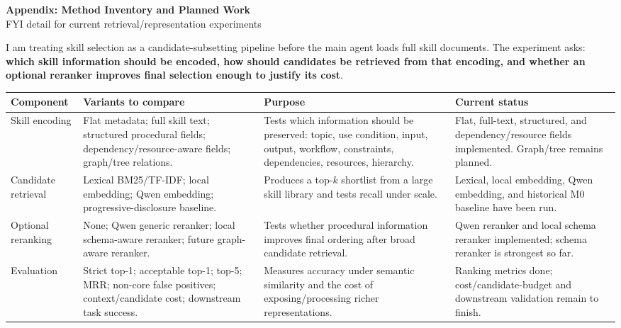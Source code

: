 \documentclass[10pt,a4paper]{article}
\newcommand{\sectiontitle}[1]{\vspace{0.22em}{\normalsize\bfseries\color{headingblue} #1}\par\vspace{-0.35em}}
\begin{document}
\newpage

\begin{center}
{\large\bfseries Appendix: Method Inventory and Planned Work}\\[-0.15em]
{\small FYI detail for current retrieval/representation experiments}
\end{center}

\sectiontitle{Planned Retrieval Architecture}

I am treating skill selection as a candidate-subsetting pipeline before the main agent loads full skill documents. The experiment asks: \textbf{which skill information should be encoded, how should candidates be retrieved from that encoding, and whether an optional reranker improves final selection enough to justify its cost}.

\begin{center}
\scriptsize
\begin{tabular}{@{}p{3.1cm}p{5.0cm}p{4.1cm}p{4.7cm}@{}}
\toprule
\textbf{Component} & \textbf{Variants to compare} & \textbf{Purpose} & \textbf{Current status} \\
\midrule
Skill encoding & Flat metadata; full skill text; structured procedural fields; dependency/resource-aware fields; graph/tree relations. & Tests which information should be preserved: topic, use condition, input, output, workflow, constraints, dependencies, resources, hierarchy. & Flat, full-text, structured, and dependency/resource fields implemented. Graph/tree remains planned. \\
Candidate retrieval & Lexical BM25/TF-IDF; local embedding; Qwen embedding; progressive-disclosure baseline. & Produces a top-$k$ shortlist from a large skill library and tests recall under scale. & Lexical, local embedding, Qwen embedding, and historical M0 baseline have been run. \\
Optional reranking & None; Qwen generic reranker; local schema-aware reranker; future graph-aware reranker. & Tests whether procedural information improves final ordering after broad candidate retrieval. & Qwen reranker and local schema reranker implemented; schema reranker is strongest so far. \\
Evaluation & Strict top-1; acceptable top-1; top-5; MRR; non-core false positives; context/candidate cost; downstream task success. & Measures accuracy under semantic similarity and the cost of exposing/processing richer representations. & Ranking metrics done; cost/candidate-budget and downstream validation remain to finish. \\
\bottomrule
\end{tabular}
\end{center}
\end{document}
